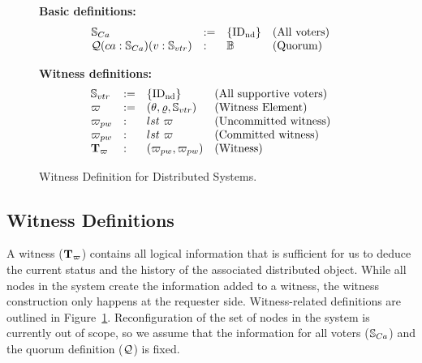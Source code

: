 \begin{figure}
\raggedright
\textbf{Basic definitions:}  \\
$$
\begin{array}{llll}
\mathbb{S}_{Ca} & := & \{\mathrm{ID_{nd}}\} & \mbox{(All voters)}\\
\mathcal{Q} (ca: \mathbb{S}_{Ca}) (v: \mathbb{S}_{vtr}) &:& \mathbb{B} & \mbox{(Quorum)} \\
\end{array}
$$
\raggedright
\textbf{Witness definitions:}  \\
$$
\begin{array}{llll}
\mathbb{S}_{vtr} & := & \{\mathrm{ID_{nd}}\} & \mbox{(All supportive voters)}\\
\varpi & :=  & ( \theta, \varrho, \mathbb{S}_{vtr}) & \mbox{(Witness Element)}\\
{\varpi_{pw}} &: & lst \ \varpi   & \mbox{(Uncommitted witness)}\\
{\varpi_{pw}} &: & lst \ \varpi   & \mbox{(Committed witness)}\\
{\textbf{T}_{\varpi}} &: &  ({\varpi_{pw}} , {\varpi_{pw}}) & \mbox{(Witness)}\\
\end{array}
$$
\caption{Witness Definition for Distributed Systems.}
\label{fig:chapter:witnesspassing:witness-definition}
\end{figure}

\subsection{Witness Definitions} 
\label{chapte:witnesspassing:subsec:witness-definition}

A witness (${\textbf{T}_{\varpi}}$) contains all logical information that is sufficient for us to deduce the current status and the history of the associated distributed object. 
While all nodes in the system create the information added to a witness, the witness construction only
happens at the requester side. Witness-related definitions are outlined in
Figure~\ref{fig:chapter:witnesspassing:witness-definition}.
Reconfiguration of the set of nodes in the system is currently out of scope, so we assume that the information for all voters ($\mathbb{S}_{Ca}$) and the quorum definition ($\mathcal{Q}$) is fixed.

